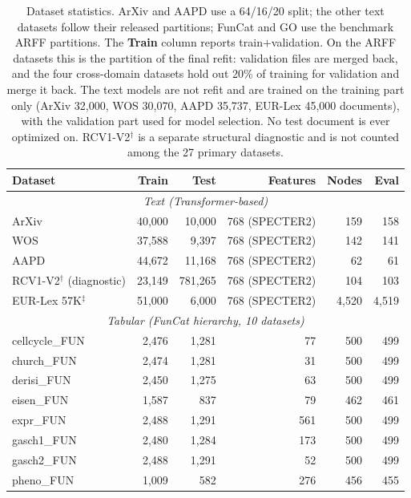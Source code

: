 \documentclass[preprint,12pt]{elsarticle}
\begin{document}
\begin{table}[htbp]
\centering
\caption{Dataset statistics. ArXiv and AAPD use a 64/16/20 split; the
other text datasets follow their released partitions; FunCat and GO
use the benchmark ARFF partitions. The \textbf{Train} column reports
train$+$validation. On the ARFF datasets this is the partition of the final
refit: validation files are merged back, and the four cross-domain datasets
hold out 20\% of training for validation and merge it back. The text models
are not refit and are trained on the training part only (ArXiv 32{,}000, WOS
30{,}070, AAPD 35{,}737, EUR-Lex 45{,}000 documents), with the validation
part used for model selection. No test document is ever optimized on. RCV1-V2$^\dagger$ is a separate structural diagnostic
and is not counted among the 27 primary datasets.}
\label{tab:datasets}
\footnotesize
\renewcommand{\arraystretch}{0.85}
\begin{tabular}{lrrrrr}
\toprule
\textbf{Dataset} & \textbf{Train} & \textbf{Test} & \textbf{Features} &
\textbf{Nodes} & \textbf{Eval} \\
\midrule
\multicolumn{6}{c}{\textit{Text (Transformer-based)}} \\
ArXiv  & 40,000 & 10,000 & 768 (SPECTER2) & 159 & 158 \\
WOS    & 37,588 & 9,397  & 768 (SPECTER2) & 142 & 141 \\
AAPD   & 44,672 & 11,168 & 768 (SPECTER2) & 62  & 61 \\
RCV1-V2$^\dagger$ (diagnostic) & 23,149 & 781,265 & 768 (SPECTER2) & 104 & 103 \\
EUR-Lex 57K$^\ddagger$ & 51,000 & 6,000 & 768 (SPECTER2) & 4,520 & 4,519 \\
\midrule
\multicolumn{6}{c}{\textit{Tabular (FunCat hierarchy, 10 datasets)}} \\
cellcycle\_FUN & 2,476 & 1,281 & 77  & 500 & 499 \\
church\_FUN    & 2,474 & 1,281 & 31  & 500 & 499 \\
derisi\_FUN    & 2,450 & 1,275 & 63  & 500 & 499 \\
eisen\_FUN     & 1,587 & 837   & 79  & 462 & 461 \\
expr\_FUN      & 2,488 & 1,291 & 561 & 500 & 499 \\
gasch1\_FUN    & 2,480 & 1,284 & 173 & 500 & 499 \\
gasch2\_FUN    & 2,488 & 1,291 & 52  & 500 & 499 \\
pheno\_FUN     & 1,009 & 582   & 276 & 456 & 455 \\

\end{tabular}
\end{table}
\end{document}
